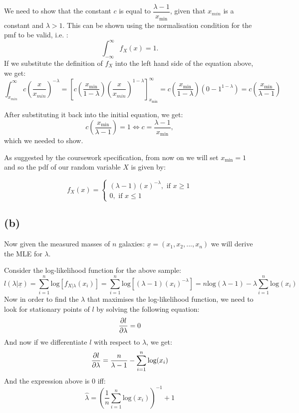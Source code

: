 \documentclass[12pt]{article}
\newcommand\intR{\int_{-\infty}^\infty}
\begin{document}
We need to show that the constant $ c $ is equal to $ \dfrac{\lambda - 1}{x_{\text{min}}} $, given that $ x_{min} $ is a constant and $ \lambda > 1 $. This can be shown using the normalisation condition for the pmf to be valid, i.e. :
\[ \intR f_X(x) = 1. \] 
If we substitute the definition of $f_X$ into the left hand side of the equation above, we get:
\[ \int_{x_{min}}^\infty  c \left(\frac{x}{x_{min}}\right)^{-\lambda} 
  = \left[ c\left(\frac{x_{\text{min}}}{1 - \lambda}\right) \left(\frac{x}{x_{min}}\right)^{1 - \lambda} \right]_{x_{\text{min}}}^\infty 
  =  c\left(\frac{x_{\text{min}}}{1 - \lambda}\right) (0 - 1^{1 - \lambda})
  = c\left(\frac{x_{\text{min}}}{\lambda - 1}\right)
 \]

 After substituting it back into the initial equation, we get:
 \[c\left(\frac{x_{\text{min}}}{\lambda - 1}\right) = 1 \iff c =\frac{\lambda - 1}{x_{\text{min}}}, \]
 which we needed to show.

 As suggested by the coursework specification, from now on we will set $ x_{\text{min}} = 1$ and so the pdf of our random variable $ X $ is given by:

\[ f_X(x) =
  \begin{cases}
    (\lambda - 1) \left(x\right)^{-\lambda} , \text{ if } x \geq 1 \\
    0,  \text{ if } x \leq 1
  \end{cases}
\]

 \subsection*{(b)}

Now given the measured masses of $ n $ galaxies: $ \underline{x} = (x_1, x_2, ..., x_n)$ we will derive the MLE for $ \lambda $.

Consider the log-likelihood function for the above sample:
\[ l(\lambda | \underline{x}) 
= \sum_{i = 1}^{n} \text{log}\left[ f_{X|\lambda} (x_i) \right]
=\sum_{i = 1}^{n} \text{log}\left[ (\lambda - 1) (x_i)^{-\lambda}  \right]
= n \text{log} (\lambda - 1) - \lambda \sum_{i = 1}^{n} \text{log}(x_i) \]
Now in order to find the $ \lambda $ that maximises the log-likelihood function, we need to look for stationary points of $ l $ by solving the following equation:
\[ \pdv{l}{\lambda} = 0\]
And now if we differentiate $ l $ with respect to $ \lambda $, we get:
\[ \pdv{l}{\lambda} = \frac{n}{\lambda - 1} - \sum_{i = 1}^{n} \text{log} (x_i)\]
And the expression above is 0 iff:
\[ \hat{\lambda} = \left(\frac{1}{n} \sum_{i = 1}^{n} \text{log} (x_i) \right)^{-1} + 1  \]
\end{document}

